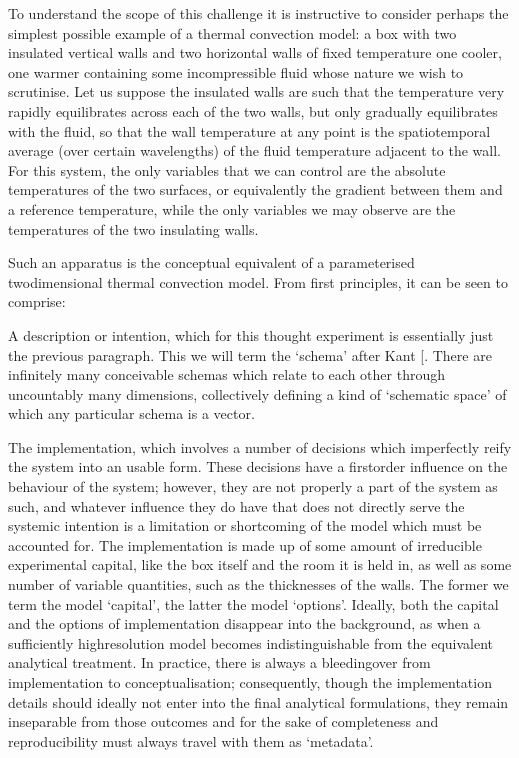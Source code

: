 \documentclass[letterpaper,10pt,english]{jupyterBook}
\begin{document}
\sphinxAtStartPar
To understand the scope of this challenge it is instructive to consider perhaps the simplest possible example of a thermal convection model: a box with two insulated vertical walls and two horizontal walls of fixed temperature \sphinxhyphen{} one cooler, one warmer \sphinxhyphen{} containing some incompressible fluid whose nature we wish to scrutinise. Let us suppose the insulated walls are such that the temperature very rapidly equilibrates across each of the two walls, but only gradually equilibrates with the fluid, so that the wall temperature at any point is the spatiotemporal average (over certain wavelengths) of the fluid temperature adjacent to the wall. For this system, the only variables that we can control are the absolute temperatures of the two surfaces, or equivalently the gradient between them and a reference temperature, while the only variables we may observe are the temperatures of the two insulating walls.

\sphinxAtStartPar
Such an apparatus is the conceptual equivalent of a parameterised two\sphinxhyphen{}dimensional thermal convection model. From first principles, it can be seen to comprise:

\sphinxAtStartPar
A description or intention, which for this thought experiment is essentially just the previous paragraph. This we will term the ‘schema’ after Kant {[}\sphinxcite{references:id64}{]}. There are infinitely many conceivable schemas which relate to each other through uncountably many dimensions, collectively defining a kind of ‘schematic space’ of which any particular schema is a vector.

\sphinxAtStartPar
The implementation, which involves a number of decisions which imperfectly reify the system into an usable form. These decisions have a first\sphinxhyphen{}order influence on the behaviour of the system; however, they are not properly a part of the system as such, and whatever influence they do have that does not directly serve the systemic intention is a limitation or shortcoming of the model which must be accounted for. The implementation is made up of some amount of irreducible experimental capital, like the box itself and the room it is held in, as well as some number of variable quantities, such as the thicknesses of the walls. The former we term the model ‘capital’, the latter the model ‘options’. Ideally, both the capital and the options of implementation disappear into the background, as when a sufficiently high\sphinxhyphen{}resolution model becomes indistinguishable from the equivalent analytical treatment. In practice, there is always a bleeding\sphinxhyphen{}over from implementation to conceptualisation; consequently, though the implementation details should ideally not enter into the final analytical formulations, they remain inseparable from those outcomes and \sphinxhyphen{} for the sake of completeness and reproducibility \sphinxhyphen{} must always travel with them as ‘metadata’.
\end{document}
